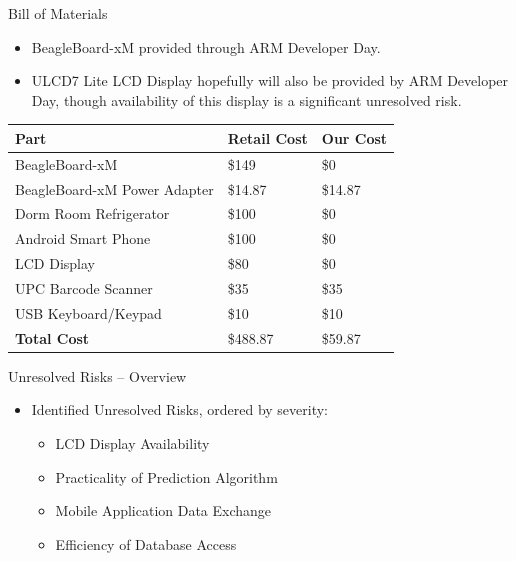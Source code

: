 \documentclass[t]{beamer}
\begin{document}
\begin{frame}{Bill of Materials}
\begin{itemize}
\item BeagleBoard-xM provided through ARM Developer Day.
\item ULCD7 Lite LCD Display hopefully will also be provided by ARM Developer Day,  though availability of this display is a significant unresolved risk.
\end{itemize}
\vspace{.5cm}
\footnotesize
\begin{center}
\begin{tabular}{| p{2.0in} | p{.75in} |p{.75in} |}
\hline
Part & Retail Cost & Our Cost \\
\hline
BeagleBoard-xM & \$149 & \$0 \\
\hline
BeagleBoard-xM Power Adapter & \$14.87 & \$14.87 \\
\hline
Dorm Room Refrigerator & \$100 & \$0 \\
\hline
Android Smart Phone & \$100 & \$0  \\
\hline
LCD Display & \$80  & \$0 \\
\hline
UPC Barcode Scanner & \$35 & \$35 \\
\hline
USB Keyboard/Keypad & \$10 & \$10 \\
\hline
\hline
\textbf{Total Cost} & \$488.87 & \$59.87 \\
\hline
\end{tabular}
\end{center}
\end{frame}

\begin{frame}{Unresolved Risks -- Overview}
\begin{itemize}
\item Identified Unresolved Risks, ordered by severity:
\begin{itemize}
\item LCD Display Availability
\item Practicality of Prediction Algorithm
\item Mobile Application Data Exchange
\item Efficiency of Database Access
\end{itemize}
\end{itemize}
\end{frame}
\end{document}
